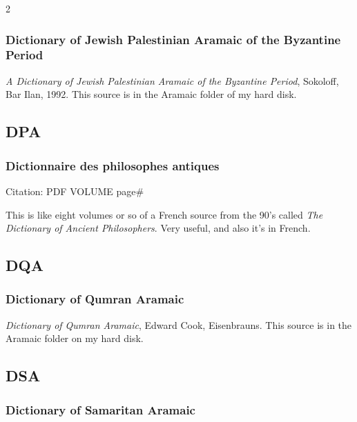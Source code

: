 \begin{multicols}{2}
		\subsubsection*{Dictionary of Jewish Palestinian Aramaic of the Byzantine Period}
		
			\textit{A Dictionary of Jewish Palestinian Aramaic of the Byzantine Period}, Sokoloff, Bar Ilan, 1992. This source is in the Aramaic folder of my hard disk.
	
	\subsection*{DPA}
	
		\subsubsection*{Dictionnaire des philosophes antiques}
		
			Citation:
				PDF VOLUME page\#
				
			This is like eight volumes or so of a French source from the 90's called \textit{The Dictionary of Ancient Philosophers}. Very useful, and also it's in French.
			
	\subsection*{DQA}
	
		\subsubsection*{Dictionary of Qumran Aramaic}
		
			\textit{Dictionary of Qumran Aramaic}, Edward Cook, Eisenbrauns. This source is in the Aramaic folder on my hard disk.
			
	\subsection*{DSA}
	
		\subsubsection*{Dictionary of Samaritan Aramaic}
		

\end{multicols}
